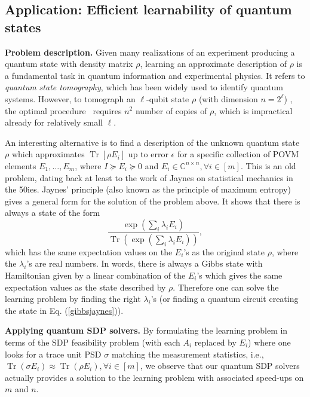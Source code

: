 \documentclass[a4paper,UKenglish,cleveref, autoref]{lipics-v2019}
\theoremstyle{remark}
\numberwithin{equation}{section}
\numberwithin{oracle}{section}
\numberwithin{remark}{section}
\newcommand{\eps}{\varepsilon}
\DeclareMathOperator{\tr}{Tr}
\DeclareMathOperator{\Tr}{Tr}
\newcommand{\hd}[1]{\vspace{2mm} \noindent \textbf{#1}}
\def \eps {\epsilon}
\begin{document}
\subsection{Application: Efficient learnability of quantum states}\label{sec:learn_intro}

\hd{Problem description.} Given many realizations of an experiment producing a quantum state with density matrix $\rho$, learning an approximate description of $\rho$ is a fundamental task in quantum information and experimental physics. It refers to \emph{quantum state tomography}, which has been widely used to identify quantum systems.
However, to tomograph an $\ell$-qubit state $\rho$ (with dimension $n=2^\ell$) , the optimal procedure~\cite{OW16,HHJWY16} requires $n^2$ number of copies of $\rho$, which is impractical already for relatively small $\ell$.

An interesting alternative is to find a description of the unknown quantum state $\rho$ which approximates $\Tr[\rho E_{i}]$ up to error $\eps$ for a specific collection of POVM elements $E_1,\ldots,E_m$, where $I  \succeq E_i \succeq 0$ and $E_i\in \mathbb{C}^{n\times n}, \forall i \in [m]$. This is an old problem, dating back at least to the work of Jaynes on statistical mechanics in the 50ies. Jaynes' principle \cite{jaynes1957information} (also known as the principle of maximum entropy) gives a general form for the solution of the problem above. It shows that there is always a state of the form
\begin{equation}\label{gibbsjaynes}
\frac{ \exp \left ( \sum_i \lambda_i E_i  \right) }{  \tr \left( \exp \left( \sum_i \lambda_i E_i  \right)\right)},
\end{equation}
which has the same expectation values on the $E_i$'s as the original state $\rho$, where the $\lambda_i$'s are real numbers. In words, there is always a Gibbs state with Hamiltonian given by a linear combination of the $E_i$'s which gives the same expectation values as the state described by $\rho$. Therefore one can solve the learning problem by finding the right $\lambda_i$'s (or finding a quantum circuit creating the state in Eq. (\ref{gibbsjaynes})).

\hd{Applying quantum SDP solvers.} By formulating the learning problem in terms of the SDP feasibility problem (with each $A_i$ replaced by $E_i$) where one looks for a trace unit PSD $\sigma$ matching the measurement statistics, i.e., $\Tr(\sigma E_i) \approx \Tr(\rho E_i), \forall i \in [m]$, we observe that our quantum SDP solvers actually provides a solution to the learning problem with associated speed-ups on $m$ and $n$.
\end{document}
